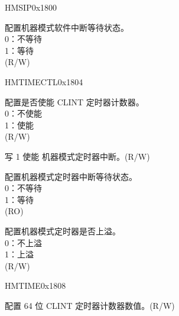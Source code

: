 
\begin{register}{H}{MSIP}{0x1800}\label{regdesc:CLINTMSIPREG}
%
%
\regnewline%
\begin{regdesc}
\begin{reglist}
\label{fielddesc:CLINTMSIP}\item[MSIP] 配置机器模式软件中断等待状态。\\
0：不等待\\
1：等待\\
(R/W)
\end{reglist}
\end{regdesc}
\end{register}

\begin{register}{H}{MTIMECTL}{0x1804}\label{regdesc:CLINTMTIMECTLREG}
%
%
%
%
%
\regnewline%
\begin{regdesc}
\begin{reglist}
\label{fielddesc:CLINTMTIMECTLMTCE}\item [MTCE] 配置是否使能 CLINT 定时器计数器。\\
0：不使能\\
1：使能\\
(R/W)
\label{fielddesc:CLINTMTIMECTLMTIE}\item [MTIE] 写 1 使能 机器模式定时器中断。(R/W)
\label{fielddesc:CLINTMTIMECTLMTIP}\item [MTIP] 配置机器模式定时器中断等待状态。\\
0：不等待\\
1：等待\\
(RO)
\label{fielddesc:CLINTMTIMECTLMTOF}\item [MTOF] 配置机器模式定时器是否上溢。\\
0：不上溢\\
1：上溢\\
(R/W)
\end{reglist}
\end{regdesc}
\end{register}

\begin{register}{H}{MTIME}{0x1808}\label{regdesc:CLINTMTIMEREG}
%
\regnewline%
%
\regnewline%
\begin{regdesc}
\begin{reglist}
\label{fielddesc:CLINTMTIME}\item [MTIME] 配置 64 位 CLINT 定时器计数器数值。(R/W)
\end{reglist}
\end{regdesc}
\end{register}

